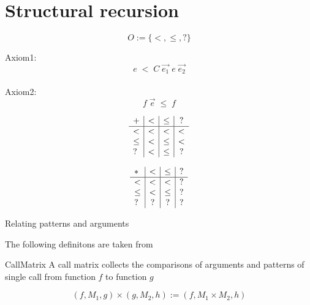 \section{Structural recursion}

\begin{definition}[Order]
\[ O := \{ < , \leq , ? \} \]
\end{definition}
Axiom1:
\[ e \; < \; C \; \vec{e_1} \; e \; \vec{e_2} \]
\\
Axiom2:
\[ f \; \vec{e} \; \leq \; f \] 

\begin{definition}
\[
\begin{array}{l | c |c | c }

 +    &  <   &  \leq   &  ? \\
 \hline 
 <    &  <   & <       &  < \\
 \leq &  <   & \leq    &  <  \\
 ?    &  <   & \leq    &  ?
\end{array}
\]

\end{definition}


\begin{definition}
\[
\begin{array}{l | c |c | c}
 *   &  <  &  \leq & ? \\
\hline
  <   & <    & <    &   ? \\
 \leq & <    & \leq &   ?  \\
 ?    & ?    & ?    &   ?
\end{array}
\]
\end{definition}

\begin{definition}{Relating patterns and arguments}
\end{definition}

The following definitons are taken from \cite{abelAltenkirch:predStRec}

\begin{definition}
CallMatrix
A call matrix collects the comparisons of arguments and patterns of single call from function $f$ to function $g$
\end{definition}

\begin{definition}

\[(f,M_1,g) \times (g,M_2,h) := (f,M_1 \times M_2,h)\]
\end{definition}

